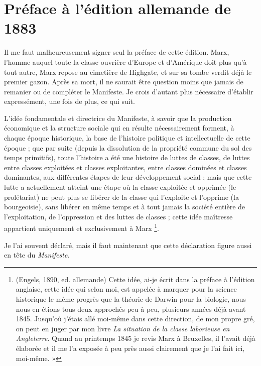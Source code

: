 \documentclass[french,twoside]{book} %
\newcommand{\byline}[1]{\bigskip{\RaggedLeft{#1}\par}\bigskip}
\begin{document}
\section[Préface à l’édition allemande de 1883]{Préface à l’édition allemande de 1883}
\noindent Il me faut malheureusement signer seul la préface de cette édition. Marx, l’homme auquel toute la classe ouvrière d’Europe et d’Amérique doit plus qu’à tout autre, Marx repose au cimetière de Highgate, et sur sa tombe verdit déjà le premier gazon. Après sa mort, il ne saurait être question moins que jamais de remanier ou de compléter le Manifeste. Je crois d’autant plus nécessaire d’établir expressément, une fois de plus, ce qui suit.\par
L'idée fondamentale et directrice du Manifeste, à savoir que la production économique et la structure sociale qui en résulte nécessairement forment, à chaque époque historique, la base de l’histoire politique et intellectuelle de cette époque ; que par suite (depuis la dissolution de la propriété commune du sol des temps primitifs), toute l’histoire a été une histoire de luttes de classes, de luttes entre classes exploitées et classes exploitantes, entre classes dominées et classes dominantes, aux différentes étapes de leur développement social ; mais que cette lutte a actuellement atteint une étape où la classe exploitée et opprimée (le prolétariat) ne peut plus se libérer de la classe qui l’exploite et l’opprime (la bourgeoisie), sans libérer en même temps et à tout jamais la société entière de l’exploitation, de l’oppression et des luttes de classes ; cette idée maîtresse appartient uniquement et exclusivement à Marx \footnote{ \noindent (Engels, 1890, ed. allemande) Cette idée, ai-je écrit dans la préface à l’édition anglaise, cette idée qui selon moi, est appelée à marquer pour la science historique le même progrès que la théorie de Darwin pour la biologie, nous nous en étions tous deux approchés peu à peu, plusieurs années déjà avant 1845. Jusqu’où j’étais allé moi-même dans cette direction, de mon propre gré, on peut en juger par mon livre \emph{La situation de la classe laborieuse en Angleterre}. Quand au printemps 1845 je revis Marx à Bruxelles, il l’avait déjà élaborée et il me l’a exposée à peu près aussi clairement que je l’ai fait ici, moi-même. »
 }.\par
Je l’ai souvent déclaré, mais il faut maintenant que cette déclaration figure aussi en tête du \emph{Manifeste}.\par

\byline{Friedrich Engels ; \\
Londres, 28 juin 1883}
\end{document}
